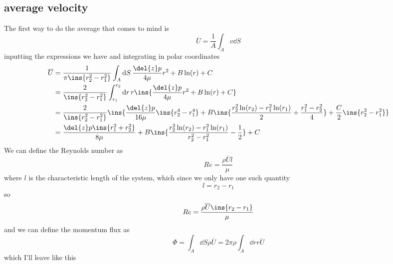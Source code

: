 \subsection{average velocity}
The first way to do the average that comes to mind is
\begin{equation}
    \overline{U} = \frac{1}{A}\int_{A}v\dd{S}
\end{equation}
inputting the expressions we have and integrating in polar coordinates
\begin{align}
    \overline{U} &= \frac{1}{\pi\ins{r_2^2-r_1^2}}\int_{A}\dd{S}\frac{\del{z}p}{4\mu}r^2+B\ln(r)+C \\
    &= \frac{2}{\ins{r_2^2-r_1^2}}\int_{r_1}^{r_2}\dd{r}r\ins{\frac{\del{z}p}{4\mu}r^2+B\ln(r)+C} \\
    &= \frac{2}{\ins{r_2^2-r_1^2}}\ins{\frac{\del{z}p}{16\mu}\ins{r_2^4-r_1^4}+B\ins{\frac{r_2^2\ln(r_2)-r_1^2\ln(r_1)}{2}+\frac{r_1^2-r_2^2}{4}}+\frac{C}{2}\ins{r_2^2-r_1^2}} \\
    &= \frac{\del{z}p\ins{r_1^2+r_2^2}}{8\mu}+B\ins{\frac{r_2^2\ln(r_2)-r_1^2\ln(r_1)}{r_2^2-r_1^2}-\frac{1}{2}}+C
\end{align}
We can define the Reynolds number as 
\begin{equation}
    Re = \frac{\rho\overline{U}l}{\mu}
\end{equation}
where \(l\) is the characteristic length of the system, which since we only have one such quantity
\begin{equation}
    l = r_2-r_1
\end{equation}
so 
\begin{equation}
    Re = \frac{\rho\overline{U}\ins{r_2-r_1}}{\mu}
\end{equation}
and we can define the momentum flux as 
\begin{equation}
    \Phi = \int_{A}\dd{S}\rho\overline{U} = 2\pi\rho\int_{A}\dd{r}r\overline{U}
\end{equation}
which I'll leave like this
